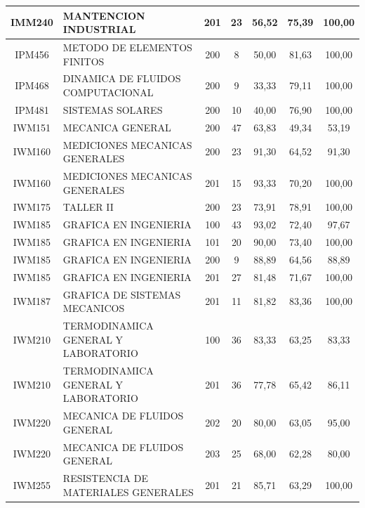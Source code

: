 \documentclass[12pt]{article}
\begin{document}
\begin{table}[H]
{\begin{tabular}{|c|l|c|c|c|c|c|}
\rowcolor[HTML]{DAEBFB} 
IMM240 & MANTENCION INDUSTRIAL & 201 & 23 & 56,52 & 75,39 & 100,00 \\ \hline
\rowcolor[HTML]{DAEBFB} 
IPM456 & METODO DE ELEMENTOS FINITOS & 200 & 8 & 50,00 & 81,63 & 100,00 \\ \hline
\rowcolor[HTML]{DAEBFB} 
IPM468 & DINAMICA DE FLUIDOS COMPUTACIONAL & 200 & 9 & 33,33 & 79,11 & 100,00 \\ \hline
\rowcolor[HTML]{DAEBFB} 
IPM481 & SISTEMAS SOLARES & 200 & 10 & 40,00 & 76,90 & 100,00 \\ \hline
\rowcolor[HTML]{DAEBFB} 
IWM151 & MECANICA GENERAL & 200 & 47 & 63,83 & 49,34 & 53,19 \\ \hline
\rowcolor[HTML]{DAEBFB} 
IWM160 & MEDICIONES MECANICAS GENERALES & 200 & 23 & 91,30 & 64,52 & 91,30 \\ \hline
\rowcolor[HTML]{DAEBFB} 
IWM160 & MEDICIONES MECANICAS GENERALES & 201 & 15 & 93,33 & 70,20 & 100,00 \\ \hline
\rowcolor[HTML]{DAEBFB} 
IWM175 & TALLER II & 200 & 23 & 73,91 & 78,91 & 100,00 \\ \hline
\rowcolor[HTML]{DAEBFB} 
IWM185 & GRAFICA EN INGENIERIA & 100 & 43 & 93,02 & 72,40 & 97,67 \\ \hline
\rowcolor[HTML]{DAEBFB} 
IWM185 & GRAFICA EN INGENIERIA & 101 & 20 & 90,00 & 73,40 & 100,00 \\ \hline
\rowcolor[HTML]{DAEBFB} 
IWM185 & GRAFICA EN INGENIERIA & 200 & 9 & 88,89 & 64,56 & 88,89 \\ \hline
\rowcolor[HTML]{DAEBFB} 
IWM185 & GRAFICA EN INGENIERIA & 201 & 27 & 81,48 & 71,67 & 100,00 \\ \hline
\rowcolor[HTML]{DAEBFB} 
IWM187 & GRAFICA DE SISTEMAS MECANICOS & 201 & 11 & 81,82 & 83,36 & 100,00 \\ \hline
\rowcolor[HTML]{DAEBFB} 
IWM210 & TERMODINAMICA GENERAL Y LABORATORIO & 100 & 36 & 83,33 & 63,25 & 83,33 \\ \hline
\rowcolor[HTML]{DAEBFB} 
IWM210 & TERMODINAMICA GENERAL Y LABORATORIO & 201 & 36 & 77,78 & 65,42 & 86,11 \\ \hline
\rowcolor[HTML]{DAEBFB} 
IWM220 & MECANICA DE FLUIDOS GENERAL & 202 & 20 & 80,00 & 63,05 & 95,00 \\ \hline
\rowcolor[HTML]{DAEBFB} 
IWM220 & MECANICA DE FLUIDOS GENERAL & 203 & 25 & 68,00 & 62,28 & 80,00 \\ \hline
\rowcolor[HTML]{DAEBFB} 
IWM255 & RESISTENCIA DE MATERIALES GENERALES & 201 & 21 & 85,71 & 63,29 & 100,00 \\ \hline

\end{tabular}}
\end{table}
\end{document}
